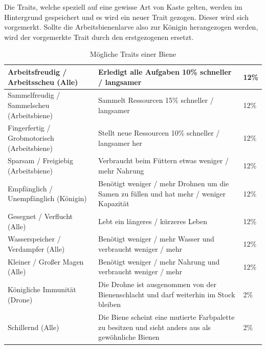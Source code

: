 Die Traits, welche speziell auf eine gewisse Art von Kaste gelten, werden im Hintergrund gespeichert und es wird ein neuer Trait gezogen. Dieser wird sich vorgemerkt. Sollte die Arbeitsbienenlarve also zur Königin herangezogen werden, wird der vorgemerkte Trait durch den erstgezogenen ersetzt.
\begin{table}[]
    \centering
    \caption{Mögliche Traits einer Biene}
    \label{table:traits}
    \begin{tabular}{|l|l|l|}
    \hline
    Arbeitsfreudig / Arbeitsscheu (Alle)        & Erledigt alle Aufgaben 10\% schneller / langsamer                                                   & 12\% \\ \hline
    Sammelfreudig / Sammelscheu (Arbeitsbiene)  & Sammelt Ressourcen 15\% schneller / langsamer                                                       & 12\% \\ \hline
    Fingerfertig / Grobmotorisch (Arbeitsbiene) & Stellt neue Ressourcen 10\% schneller / langsamer her                                               & 12\% \\ \hline
    Sparsam / Freigiebig (Arbeitsbiene)         & Verbraucht beim Füttern etwas weniger / mehr Nahrung                                                & 12\% \\ \hline
    Empfänglich / Unempfänglich (Königin)       & Benötigt weniger / mehr Drohnen um die Samen zu füllen und hat mehr / weniger Kapazität             & 12\% \\ \hline
    Gesegnet / Verflucht (Alle)                 & Lebt ein längeres / kürzeres Leben                                                                  & 12\% \\ \hline
    Wasserspeicher / Verdampfer (Alle)          & Benötigt weniger / mehr Wasser und verbraucht weniger / mehr                                        & 12\% \\ \hline
    Kleiner / Großer Magen (Alle)               & Benötigt weniger / mehr Nahrung und verbraucht weniger / mehr                                       & 12\% \\ \hline
    Königliche Immunität (Drone)                & Die Drohne ist ausgenommen von der Bienenschlacht und darf weiterhin im Stock bleiben               & 2\%  \\ \hline
    Schillernd (Alle)                           & Die Biene scheint eine mutierte Farbpalette zu besitzen und sieht anders aus als gewöhnliche Bienen & 2\%  \\ \hline
    \end{tabular}
    \end{table}